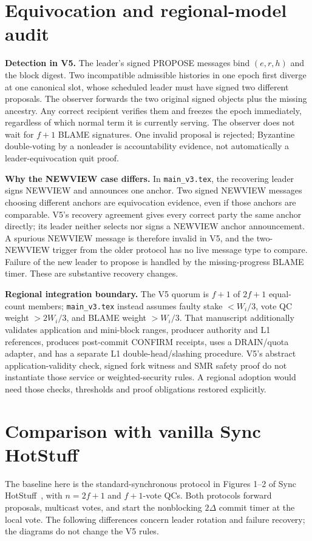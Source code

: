 \documentclass[10pt,a4paper]{article}
\begin{document}
\clearpage
\section*{Equivocation and regional-model audit}
\textbf{Detection in V5.} The leader's signed PROPOSE messages bind
$(e,r,h)$ and the block digest. Two incompatible admissible histories in one
epoch first diverge at one canonical slot, whose scheduled leader must have
signed two different proposals. The observer forwards the two original
signed objects plus the missing ancestry. Any correct recipient verifies them
and freezes the epoch immediately, regardless of which normal term it is
currently serving. The observer does not wait for $f+1$ BLAME signatures.
One invalid proposal is rejected; Byzantine double-voting by a nonleader is
accountability evidence, not automatically a leader-equivocation quit proof.

\textbf{Why the NEWVIEW case differs.} In \texttt{main\_v3.tex}, the
recovering leader signs NEWVIEW and announces one anchor. Two signed NEWVIEW
messages choosing different anchors are equivocation evidence, even if those
anchors are comparable. V5's recovery agreement gives every correct party
the same anchor directly; its leader neither selects nor signs a NEWVIEW
anchor announcement. A spurious NEWVIEW message is therefore invalid in
V5, and the two-NEWVIEW trigger from the older protocol has no live message
type to compare. Failure of the new leader to propose is handled by the
missing-progress BLAME timer. These are substantive recovery changes.

\textbf{Regional integration boundary.} The V5 quorum is $f+1$ of
$2f+1$ equal-count members; \texttt{main\_v3.tex} instead assumes faulty
stake $<W_i/3$, vote QC weight $>2W_i/3$, and BLAME weight $>W_i/3$.
That manuscript additionally validates application and mini-block ranges,
producer authority and L1 references, produces post-commit CONFIRM receipts,
uses a DRAIN/quota adapter, and has a separate L1 double-head/slashing
procedure. V5's abstract
application-validity check, signed fork witness and SMR safety proof do not
instantiate those service or weighted-security rules. A regional adoption
would need those checks, thresholds and proof obligations restored explicitly.

\section*{Comparison with vanilla Sync HotStuff}
The baseline here is the standard-synchronous protocol in Figures 1--2 of
Sync HotStuff~\cite{sync}, with $n=2f+1$ and $f+1$-vote QCs. Both protocols
forward proposals, multicast votes, and start the nonblocking $2\Delta$
commit timer at the local vote. The following differences concern leader
rotation and failure recovery; the diagrams do not change the V5 rules.
\end{document}
